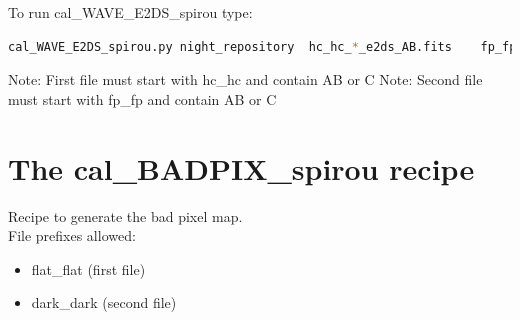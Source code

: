 To run cal\_WAVE\_E2DS\_spirou type:
\begin{lstlisting}[language=bash, style=bashstyle]
cal_WAVE_E2DS_spirou.py night_repository  hc_hc_*_e2ds_AB.fits    fp_fp_*_e2ds_AB.fits 
\end{lstlisting}

\noindent Note: First file must start with hc\_hc and contain AB or C
\noindent Note: Second file must start with fp\_fp and contain AB or C







\clearpage
\newpage
\section{The cal\_BADPIX\_spirou recipe}
\label{section:cal_BADPIX_spirou}

Recipe to generate the bad pixel map. \\


\noindent File prefixes allowed:
\begin{itemize}
	\item flat\_flat (first file)
	\item dark\_dark (second file)
\end{itemize}

